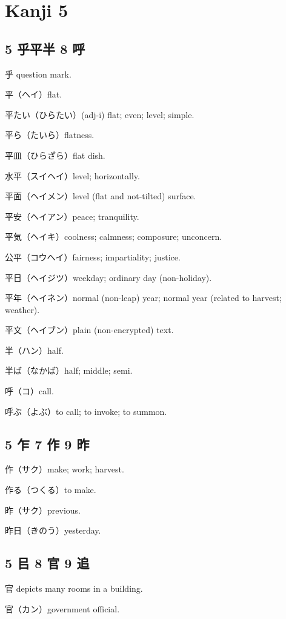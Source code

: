 \chapter{Kanji 5}

\section{5 乎平半 8 呼}

乎 question mark.

平（ヘイ）flat.

平たい（ひらたい）(adj-i) flat; even; level; simple.

平ら（たいら）flatness.

平皿（ひらざら）flat dish.

水平（スイヘイ）level; horizontally.

平面（ヘイメン）level (flat and not-tilted) surface.

平安（ヘイアン）peace; tranquility.

平気（ヘイキ）coolness; calmness; composure; unconcern.

公平（コウヘイ）fairness; impartiality; justice.

平日（ヘイジツ）weekday; ordinary day (non-holiday).

平年（ヘイネン）normal (non-leap) year; normal year (related to harvest; weather).

平文（ヘイブン）plain (non-encrypted) text.

半（ハン）half.

半ば（なかば）half; middle; semi.

呼（コ）call.

呼ぶ（よぶ）to call; to invoke; to summon.

\section{5 乍 7 作 9 昨}

作（サク）make; work; harvest.

作る（つくる）to make.

昨（サク）previous.

昨日（きのう）yesterday.

\section{5 㠯 8 官 9 追}

官 depicts many rooms in a building.

官（カン）government official.

